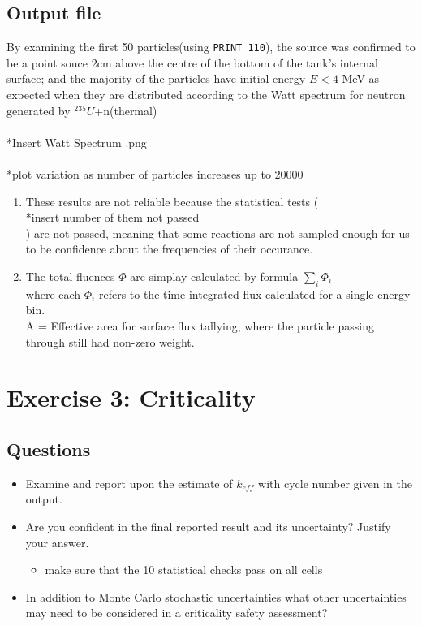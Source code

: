 \documentclass[a4paper, 12pt]{article}
\begin{document}
\subsection{Output file}
By examining the first 50 particles(using \texttt{PRINT 110}), the source was confirmed to be a point souce 2cm above the centre of the bottom of the tank's internal surface; and the majority of the particles have initial energy $E<4$ MeV as expected when they are distributed according to the Watt spectrum for neutron generated by ${}^{235}U$+n(thermal)\\
\\*Insert Watt Spectrum .png\\
\\*plot variation as number of particles increases up to 20000\\
\begin{enumerate}
	\item These results are not reliable because the statistical tests (\\*insert number of them not passed\\) are not passed, meaning that some reactions are not sampled enough for us to be confidence about the frequencies of their occurance.
	\item The total fluences $\Phi$ are simplay calculated by formula $\sum_i \Phi_i$ 
		\\where each $\Phi_i$ refers to the time-integrated flux calculated for a single energy bin.
		\\      A = Effective area for surface flux tallying, where the particle passing through still had non-zero weight.
\end{enumerate}
\section{Exercise 3: Criticality}
\subsection{Questions}
\begin{itemize}
	\item Examine and report upon the estimate of $k_{eff}$ with cycle number given in the output.
	\item Are you confident in the final reported result and its uncertainty? Justify your answer.
	\begin{itemize}
		\item make sure that the 10 statistical checks pass on all cells
	\end{itemize}
	\item In addition to Monte Carlo stochastic uncertainties what other uncertainties may need 
	to be considered in a criticality safety assessment?
\end{itemize}
\end{document}
